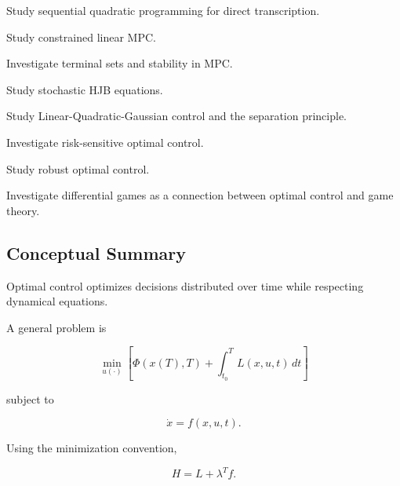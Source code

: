 \begin{exercise}[4]
Study sequential quadratic programming for direct transcription.
\end{exercise}

\begin{exercise}[4]
Study constrained linear MPC.
\end{exercise}

\begin{exercise}[4]
Investigate terminal sets and stability in MPC.
\end{exercise}

\begin{exercise}[4]
Study stochastic HJB equations.
\end{exercise}

\begin{exercise}[4]
Study Linear-Quadratic-Gaussian control and the separation principle.
\end{exercise}

\begin{exercise}[4]
Investigate risk-sensitive optimal control.
\end{exercise}

\begin{exercise}[4]
Study robust optimal control.
\end{exercise}

\begin{exercise}[4]
Investigate differential games as a connection between optimal control and
game theory.
\end{exercise}

\subsection{Conceptual Summary}
\label{subsec:optimal-control-summary}

Optimal control optimizes decisions distributed over time while respecting
dynamical equations.

A general problem is

\[
\boxed{
\min_{u(\cdot)}
\left[
\Phi(x(T),T)
+
\int_{t_0}^{T}
L(x,u,t)\,dt
\right]
}
\]

subject to

\[
\boxed{
\dot{x}=f(x,u,t).
}
\]

Using the minimization convention,

\[
\boxed{
H
=
L+\lambda^Tf.
}
\]


